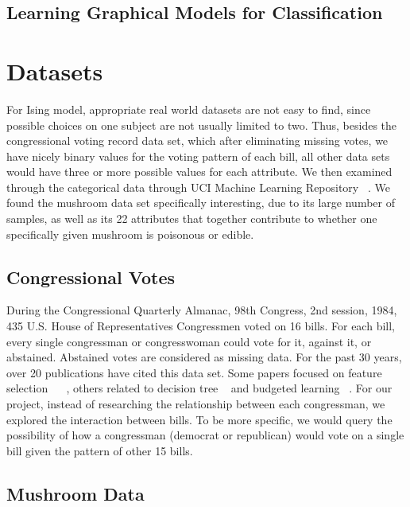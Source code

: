 \documentclass[11pt]{article}
\begin{document}
\subsection{Learning Graphical Models for Classification}
\section{Datasets}

For Ising model, appropriate real world datasets are not easy to find, since possible choices on one subject are not usually limited to two. Thus, besides the congressional voting record data set, which after eliminating missing votes, we have nicely binary values for the voting pattern of each bill, all other data sets would have three or more possible values for each attribute. We then examined through the categorical data through UCI Machine Learning Repository ~\cite{Dua:2017}. We found the mushroom data set specifically interesting, due to its large number of samples, as well as its 22 attributes that together contribute to whether one specifically given mushroom is poisonous or edible.

\subsection{Congressional Votes}

During the Congressional Quarterly Almanac, 98th Congress, 2nd session, 1984, 435 U.S. House of Representatives Congressmen voted on 16 bills. For each bill, every single congressman or congresswoman could vote for it, against it, or abstained. Abstained votes are considered as missing data. For the past 30 years, over 20 publications have cited this data set. Some papers focused on feature selection ~\cite{Chun1999ANNigma} ~\cite{Huan1998Inc}, others related to decision tree ~\cite{Erin1995Fea} and budgeted learning ~\cite{Dan2012Bud}. For our project, instead of researching the relationship between each congressman, we explored the interaction between bills. To be more specific, we would query the possibility of how a congressman (democrat or republican) would vote on a single bill given the pattern of other 15 bills.

\subsection{Mushroom Data}
\end{document}
